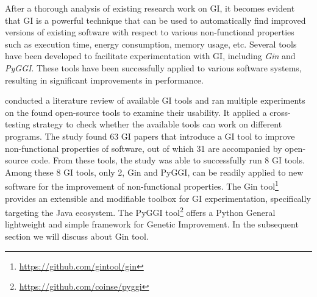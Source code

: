 After a thorough analysis of existing research work on GI, it becomes evident that GI is a powerful technique that can be used to automatically find improved versions of existing software with respect to various non-functional properties such as execution time, energy consumption, memory usage, etc. Several tools have been developed to facilitate experimentation with GI, including \textit{Gin} and \textit{PyGGI}. These tools have been successfully applied to various software systems, resulting in significant improvements in performance. 



\vspace{.5em}
\cite{DBLP:conf/gecco/ZuoBP22} conducted a literature review of available GI tools and ran multiple experiments on the found open-source tools to examine their usability. It applied a cross-testing strategy to check whether the available tools can work on different programs. The study found 63 GI papers that introduce a GI tool to improve non-functional properties of software, out of which 31 are accompanied by open-source code. From these tools, the study was able to successfully run 8 GI tools.
Among these 8 GI tools, only 2, \ie Gin and PyGGI, can be readily applied to new software for the improvement of non-functional properties. The Gin tool\footnote{\url{https://github.com/gintool/gin}} provides an extensible and modifiable toolbox for GI experimentation, specifically targeting the Java ecosystem. 
The PyGGI tool\footnote{\url{https://github.com/coinse/pyggi}} offers a Python General lightweight and simple framework for Genetic Improvement. In the subsequent section we will discuss about Gin tool. 


